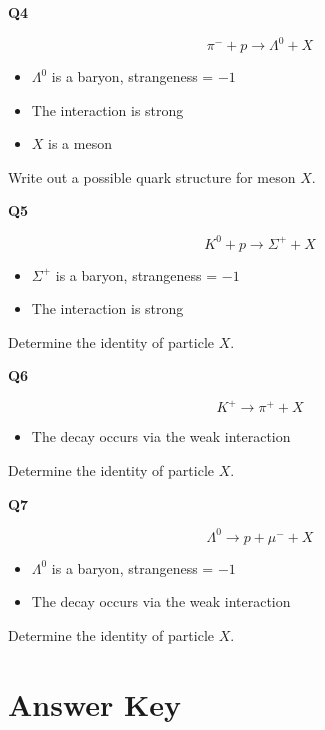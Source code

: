 \documentclass[12pt]{article}
\begin{document}
\newpage

\textbf{Q4}

\[
\pi^- + p \rightarrow \Lambda^0 + X
\]

\begin{itemize}
    \item $\Lambda^0$ is a baryon, strangeness = $-1$
    \item The interaction is strong
    \item $X$ is a meson
\end{itemize}

Write out a possible quark structure for meson $X$.

\vspace{3em}

\textbf{Q5}

\[
K^0 + p \rightarrow \Sigma^+ + X
\]

\begin{itemize}
    \item $\Sigma^+$ is a baryon, strangeness = $-1$
    \item The interaction is strong
\end{itemize}

Determine the identity of particle $X$.

\vspace{3em}

\textbf{Q6}

\[
K^+ \rightarrow \pi^+ + X
\]

\begin{itemize}
    \item The decay occurs via the weak interaction
\end{itemize}

Determine the identity of particle $X$.

\vspace{3em}

\textbf{Q7}

\[
\Lambda^0 \rightarrow p + \mu^- + X
\]

\begin{itemize}
    \item $\Lambda^0$ is a baryon, strangeness = $-1$
    \item The decay occurs via the weak interaction
\end{itemize}

Determine the identity of particle $X$.

\newpage

\section*{Answer Key}
\end{document}
